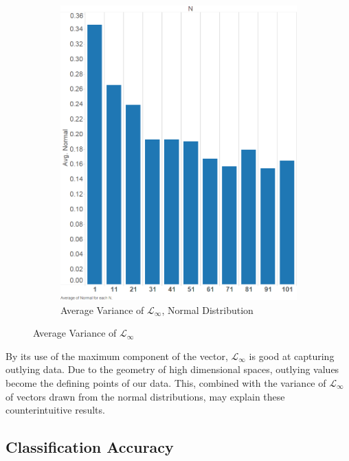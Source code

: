 \documentclass{article}
\begin{document}
\begin{figure}[H]
\centering
   \ContinuedFloat 
\begin{subfigure}[h]{0.7\textwidth}
        \includegraphics[width=.75\textwidth]{exp2-var-norm.png}
        \caption{Average Variance of $\mathcal{L}_{\infty}$, Normal Distribution}
        \label{fig:exp2varnorm}
        \end{subfigure}
        \caption{Average Variance of $\mathcal{L}_{\infty}$}
\end{figure}
By its use of the maximum component of the vector, $\mathcal{L}_{\infty}$ is good at capturing outlying data. Due to the geometry of high dimensional spaces, outlying values become the defining points of our data. This, combined with the variance of $\mathcal{L}_{\infty}$ of vectors drawn from the normal distributions, may explain these counterintuitive results.

\subsection{Classification Accuracy}
\end{document}
